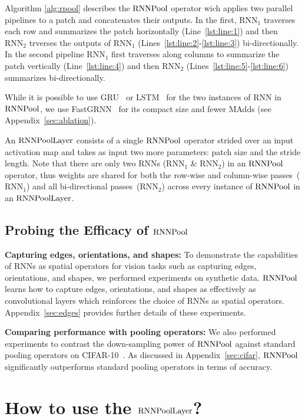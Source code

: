 \documentclass[10pt]{article}
\newcommand{\rpool}{\ensuremath{{\rm RNNPool}}\xspace}
\newcommand{\rpoollayer}{\ensuremath{{\rm RNNPoolLayer}}\xspace}
\begin{document}
Algorithm \ref{alg:rpool} describes the
\rpool operator wich applies two parallel pipelines to a patch and
concatenates their outputs. In the first, $\mathrm{RNN}_1$ traverses
each row and summarizes the patch horizontally (Line~\ref{lst:line:1})
and then $\mathrm{RNN}_2$ trverses the outputs of $\mathrm{RNN}_1$
(Lines~\ref{lst:line:2}-\ref{lst:line:3}) bi-directionally. In the
second pipeline $\mathrm{RNN}_1$ first traverses along columns to
summarize the patch vertically (Line~\ref{lst:line:4}) and then
$\mathrm{RNN}_2$ (Lines~\ref{lst:line:5}-\ref{lst:line:6}) summarizes
bi-directionally.


While it is possible to use GRU~\citep{cho2014learning} or
LSTM~\citep{hochreiter1997long} for the two instances of RNN in \rpool,
we use FastGRNN~\citep{kusupati2018fastgrnn} for its compact size and
fewer MAdds (see Appendix~\ref{sec:ablation}).

An \rpoollayer consists of a single \rpool operator strided over an
input activation map and takes as input two more parameters: patch
size and the stride length.  Note that there are only two RNNs
($\mathrm{RNN}_1$ \& $\mathrm{RNN}_2$) in an \rpool operator, thus
weights are shared for both the row-wise and column-wise
passes~($\mathrm{RNN}_1$) and all bi-directional
passes~($\mathrm{RNN}_2$) across every instance of \rpool in an
\rpoollayer.


\subsection{Probing the Efficacy of \rpool}

\textbf{Capturing edges, orientations, and shapes:} To demonstrate the
capabilities of RNNs as spatial operators for vision tasks such as
capturing edges, orientations, and shapes, we performed experiments on
synthetic data. \rpool learns how to capture edges, orientations, and
shapes as effectively as convolutional layers which reinforces the
choice of RNNs as spatial operators. Appendix~\ref{sec:edges} provides
further details of these experiments.

\textbf{Comparing performance with pooling operators:} We also
performed experiments to contrast the down-sampling power of \rpool
against standard pooling operators on
CIFAR-10~\citep{krizhevsky2009learning}. As discussed in Appendix~\ref{sec:cifar}, \rpool significantly outperforms standard pooling operators in terms of accuracy.

 \vspace{-5pt}
\section{How to use the \rpoollayer?}
\label{sec:usage}
\vspace{-5pt}
\end{document}
